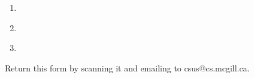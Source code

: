\documentclass[fontsize=11]{scrartcl}
\begin{document}
\begin{Form}
\begin{center}
\begin{enumerate}
    	    \item \makebox[2in]{\hrulefill}  \makebox[1in]{\hrulefill}  \makebox[1in]{\hrulefill}  \\ 
    	    
    	    \item \makebox[2in]{\hrulefill}  \makebox[1in]{\hrulefill}  \makebox[1in]{\hrulefill}  \\ 
    	    
    	    \item \makebox[2in]{\hrulefill}  \makebox[1in]{\hrulefill}  \makebox[1in]{\hrulefill}  \\ 

    	    
    \end{enumerate}
\end{center}

\end{Form}
	\vfill
	\centering
	Return this form by scanning it and emailing to csus@cs.mcgill.ca.
\end{document}
